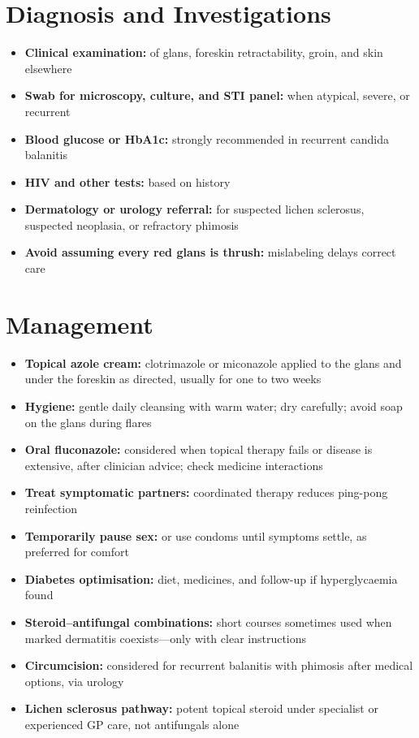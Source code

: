 \section*{Diagnosis and Investigations}
\begin{itemize}
    \item \textbf{Clinical examination:} of glans, foreskin retractability, groin, and skin elsewhere
    \item \textbf{Swab for microscopy, culture, and STI panel:} when atypical, severe, or recurrent
    \item \textbf{Blood glucose or HbA1c:} strongly recommended in recurrent candida balanitis
    \item \textbf{HIV and other tests:} based on history
    \item \textbf{Dermatology or urology referral:} for suspected lichen sclerosus, suspected neoplasia, or refractory phimosis
    \item \textbf{Avoid assuming every red glans is thrush:} mislabeling delays correct care
\end{itemize}

\section*{Management}
\begin{itemize}
    \item \textbf{Topical azole cream:} clotrimazole or miconazole applied to the glans and under the foreskin as directed, usually for one to two weeks
    \item \textbf{Hygiene:} gentle daily cleansing with warm water; dry carefully; avoid soap on the glans during flares
    \item \textbf{Oral fluconazole:} considered when topical therapy fails or disease is extensive, after clinician advice; check medicine interactions
    \item \textbf{Treat symptomatic partners:} coordinated therapy reduces ping-pong reinfection
    \item \textbf{Temporarily pause sex:} or use condoms until symptoms settle, as preferred for comfort
    \item \textbf{Diabetes optimisation:} diet, medicines, and follow-up if hyperglycaemia found
    \item \textbf{Steroid--antifungal combinations:} short courses sometimes used when marked dermatitis coexists---only with clear instructions
    \item \textbf{Circumcision:} considered for recurrent balanitis with phimosis after medical options, via urology
    \item \textbf{Lichen sclerosus pathway:} potent topical steroid under specialist or experienced GP care, not antifungals alone
\end{itemize}

